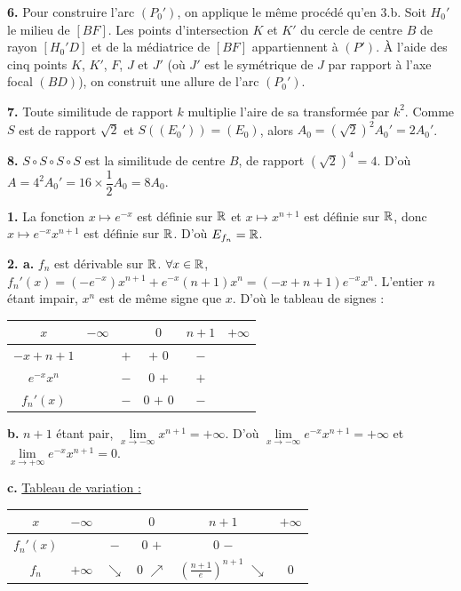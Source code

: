 \documentclass[11pt]{article}
\begin{document}
\textbf{6.} Pour construire l'arc $(P_0')$, on applique le même procédé qu'en 3.b. Soit $H_0'$ le milieu de $[BF]$. Les points d'intersection $K$ et $K'$ du cercle de centre $B$ de rayon $[H_0'D]$ et de la médiatrice de $[BF]$ appartiennent à $(P')$. À l'aide des cinq points $K$, $K'$, $F$, $J$ et $J'$ (où $J'$ est le symétrique de $J$ par rapport à l'axe focal $(BD)$), on construit une allure de l'arc $(P_0')$.

\textbf{7.} Toute similitude de rapport $k$ multiplie l'aire de sa transformée par $k^2$. Comme $S$ est de rapport $\sqrt{2}$ et $S((E_0')) = (E_0)$, alors $A_0 = (\sqrt{2})^2 A_0' = 2A_0'$.

\textbf{8.} $S \circ S \circ S \circ S$ est la similitude de centre $B$, de rapport $(\sqrt{2})^4 = 4$. D'où $A = 4^2 A_0' = 16 \times \dfrac{1}{2}A_0 = 8A_0$.


\textbf{1.} La fonction $x \mapsto e^{-x}$ est définie sur $\mathbb{R}$ et $x \mapsto x^{n+1}$ est définie sur $\mathbb{R}$, donc $x \mapsto e^{-x}x^{n+1}$ est définie sur $\mathbb{R}$. D'où $E_{f_n} = \mathbb{R}$.

\textbf{2. a.} $f_n$ est dérivable sur $\mathbb{R}$. $\forall x \in \mathbb{R}$, $f_n'(x) = (-e^{-x})x^{n+1} + e^{-x}(n+1)x^n = (-x + n + 1)e^{-x}x^n$. L'entier $n$ étant impair, $x^n$ est de même signe que $x$. D'où le tableau de signes :
\begin{center}\renewcommand{\arraystretch}{1.4}
\begin{tabular}{|c|ccccc|}
\hline
$x$ & $-\infty$ & & $0$ & $n+1$ & $+\infty$ \\
\hline
$-x + n + 1$ & & $+$ & $+$ \quad $0$ & $-$ & \\
\hline
$e^{-x}x^n$ & & $-$ & $0$ \quad $+$ & $+$ & \\
\hline
$f_n'(x)$ & & $-$ & $0$ \quad $+$ \quad $0$ & $-$ & \\
\hline
\end{tabular}
\end{center}

\textbf{b.} $n + 1$ étant pair, $\lim\limits_{x\to-\infty} x^{n+1} = +\infty$. D'où $\lim\limits_{x\to-\infty} e^{-x}x^{n+1} = +\infty$ et $\lim\limits_{x\to+\infty} e^{-x}x^{n+1} = 0$.

\textbf{c.} \underline{Tableau de variation :}
\begin{center}\renewcommand{\arraystretch}{1.4}
\begin{tabular}{|c|ccccc|}
\hline
$x$ & $-\infty$ & & $0$ & $n+1$ & $+\infty$ \\
\hline
$f_n'(x)$ & & $-$ & $0$ \quad $+$ & $0$ \quad $-$ & \\
\hline
$f_n$ & $+\infty$ & $\searrow$ & $0$ \;$\nearrow$\; & $\left(\frac{n+1}{e}\right)^{n+1}$ $\searrow$ & $0$ \\
\hline
\end{tabular}
\end{center}
\end{document}
